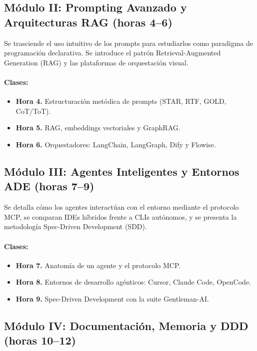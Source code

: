 \documentclass[11pt,a4paper]{article}
\begin{document}
\subsection{Módulo II: Prompting Avanzado y Arquitecturas RAG (horas 4--6)}

Se trasciende el uso intuitivo de los prompts para estudiarlos como paradigma de programación declarativa. Se introduce el patrón Retrieval-Augmented Generation (RAG) y las plataformas de orquestación visual.

\paragraph{Clases:}
\begin{itemize}
  \item \textbf{Hora 4.} Estructuración metódica de prompts (STAR, RTF, GOLD, CoT/ToT).
  \item \textbf{Hora 5.} RAG, embeddings vectoriales y GraphRAG.
  \item \textbf{Hora 6.} Orquestadores: LangChain, LangGraph, Dify y Flowise.
\end{itemize}

\subsection{Módulo III: Agentes Inteligentes y Entornos ADE (horas 7--9)}

Se detalla cómo los agentes interactúan con el entorno mediante el protocolo MCP, se comparan IDEs híbridos frente a CLIs autónomos, y se presenta la metodología Spec-Driven Development (SDD).

\paragraph{Clases:}
\begin{itemize}
  \item \textbf{Hora 7.} Anatomía de un agente y el protocolo MCP.
  \item \textbf{Hora 8.} Entornos de desarrollo agénticos: Cursor, Claude Code, OpenCode.
  \item \textbf{Hora 9.} Spec-Driven Development con la suite Gentleman-AI.
\end{itemize}

\subsection{Módulo IV: Documentación, Memoria y DDD (horas 10--12)}
\end{document}
